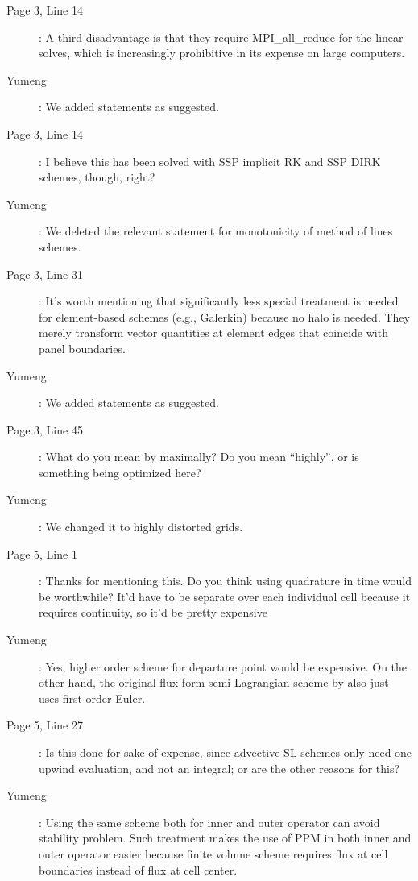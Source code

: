 \documentclass[12pt,a4paper]{article}
\begin{document}
\begin{description}
\item [Page 3, Line 14]: A third disadvantage is that they require MPI\_all\_reduce for the linear solves, which is increasingly prohibitive in its expense on large computers.

\item [Yumeng]: We added statements as suggested.

\item [Page 3, Line 14]: I believe this has been solved with SSP implicit RK and SSP DIRK schemes, though, right?

\item [Yumeng]: We deleted the relevant statement for monotonicity of method of lines schemes. 

\item [Page 3, Line 31]: It's worth mentioning that significantly less special treatment is needed for element-based schemes (e.g., Galerkin) because no halo is needed. They merely transform vector quantities at element edges that coincide with panel boundaries.

\item [Yumeng]: We added statements as suggested.

\item [Page 3, Line 45]: What do you mean by maximally? Do you mean ``highly'', or is something being optimized here?

\item [Yumeng]: We changed it to highly distorted grids. 

\item [Page 5, Line 1]: Thanks for mentioning this. Do you think using quadrature in time would be worthwhile? It'd have to be separate over each individual cell because it requires continuity, so it'd be pretty expensive

\item [Yumeng]: Yes, higher order scheme for departure point would be expensive. On the other hand, the original flux-form semi-Lagrangian scheme by \citep{LR96} also just uses first order Euler. 

\item [Page 5, Line 27]: Is this done for sake of expense, since advective SL schemes only need one upwind evaluation, and not an integral; or are the other reasons for this?

\item [Yumeng]: Using the same scheme both for inner and outer operator can avoid stability problem. Such treatment makes the use of PPM in both inner and outer operator easier because finite volume scheme requires flux at cell boundaries instead of flux at cell center.


\end{description}
\end{document}
